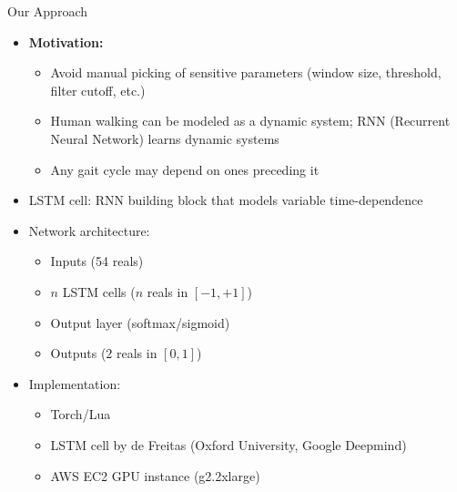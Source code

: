 \documentclass{beamer}
\begin{document}
\begin{frame}{Our Approach}
    \begin{itemize}
        \item \textbf{Motivation:}
        \begin{itemize}
            \item Avoid manual picking of sensitive parameters (window size, threshold, filter cutoff, etc.)
            \item Human walking can be modeled as a dynamic system; RNN (Recurrent Neural Network) learns dynamic systems
            \item Any gait cycle may depend on ones preceding it
        \end{itemize}
        \item LSTM cell: RNN building block that models variable time-dependence
        \item Network architecture:
        \begin{itemize}
            \item Inputs (54 reals)
            \item $n$ LSTM cells ($n$ reals in $[-1, +1]$)
            \item Output layer (softmax/sigmoid)
            \item Outputs ($2$ reals in $[0, 1]$)
        \end{itemize}
        \item Implementation:
        \begin{itemize}
            \item Torch/Lua
            \item LSTM cell by de Freitas (Oxford University, Google Deepmind)
            \item AWS EC2 GPU instance (g2.2xlarge)
        \end{itemize}
    \end{itemize}
\end{frame}
\end{document}
